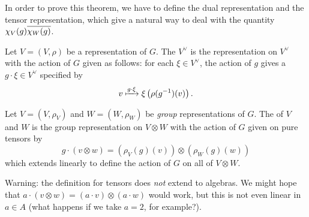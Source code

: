 In order to prove this theorem, we have to define
the dual representation and the tensor representation,
which give a natural way to deal with the quantity $\chi_V(g)\overline{\chi_W(g)}$.
\begin{definition}
	Let $V = (V, \rho)$ be a representation of $G$.
	The  $V^\vee$ is the representation on $V^\vee$
	with the action of $G$ given as follows: for each $\xi \in V^\vee$,
	the action of $g$ gives a $g \cdot \xi \in V^\vee$ specified by
	\[ v \xmapsto{g \cdot \xi} \xi\left( \rho(g^{-1})(v) \right). \]
\end{definition}
\begin{definition}
	Let $V = (V, \rho_V)$ and $W = (W, \rho_W)$
	be \emph{group} representations of $G$.
	The  of $V$ and $W$ is the group representation
	on $V \otimes W$ with the action of $G$ given on pure tensors by
	\[
		g \cdot (v \otimes w)
		=
		(\rho_V(g)(v)) \otimes (\rho_W(g)(w)) \]
	which extends linearly to define the action of $G$ on all of $V \otimes W$.
\end{definition}
\begin{remark}
	Warning: the definition for tensors does \emph{not} extend to algebras.
	We might hope that $a \cdot (v \otimes w) = (a \cdot v) \otimes (a \cdot w)$
	would work, but this is not even linear in $a \in A$
	(what happens if we take $a=2$, for example?).
\end{remark}

